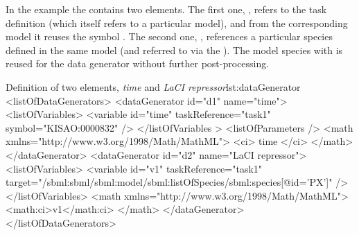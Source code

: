 In the example the  contains two  elements. 
The first one, , refers to the task definition  (which itself refers to a particular model), and from the corresponding model it reuses the symbol . The second one, , references a particular species defined in the same model (and referred to via the ). The model species with   is reused for the data generator  without further post-processing.
\begin{myXmlLst}{Definition of two  elements, \emph{time} and \emph{LaCI repressor}}{lst:dataGenerator}
<listOfDataGenerators>
	<dataGenerator id="d1" name="time">
		<listOfVariables>
			<variable id="time" taskReference="task1" symbol="KISAO:0000832" />
		</listOfVariables >
		<listOfParameters />
		<math xmlns="http://www.w3.org/1998/Math/MathML">
			<ci> time </ci>
		</math>
	</dataGenerator>
	<dataGenerator id="d2" name="LaCI repressor">
		<listOfVariables>
			<variable id="v1" taskReference="task1" 
				target="/sbml:sbml/sbml:model/sbml:listOfSpecies/sbml:species[@id='PX']" />
		</listOfVariables>
		<math xmlns="http://www.w3.org/1998/Math/MathML">
			<math:ci>v1</math:ci>
		</math>
	</dataGenerator>
</listOfDataGenerators>
\end{myXmlLst}
